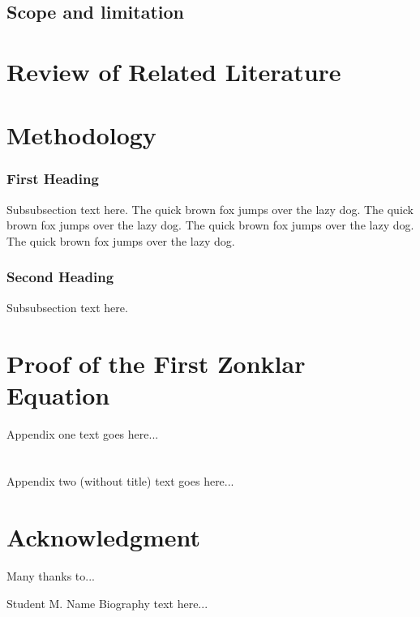 \documentclass[journal]{./IEEE/IEEEtran}
\begin{document}
\subsection{Scope and limitation}

\section{Review of Related Literature}

\section{Methodology}


\subsubsection{First Heading}
Subsubsection text here. The quick brown fox jumps over the lazy dog. The quick brown fox jumps over the lazy dog. The quick brown fox jumps over the lazy dog. The quick brown fox jumps over the lazy dog.

\subsubsection{Second Heading}
Subsubsection text here.


\appendices

\section{Proof of the First Zonklar Equation}
Appendix one text goes here...

\section{}
Appendix two (without title) text goes here...

\section*{Acknowledgment}
Many thanks to...




\begin{biography}{Student M. Name}
Biography text here...
\end{biography}
\end{document}
